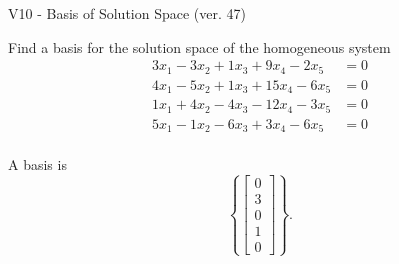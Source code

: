 \begin{exercise}
  \begin{exerciseTitle}V10 - Basis of Solution Space (ver. 47)\end{exerciseTitle}
  \begin{exerciseStatement}
    Find a basis for the solution space of the homogeneous system 
\begin{align*}
 3 x_ 1 -3 x_ 2 + 1 x_ 3 + 9 x_ 4 -2 x_ 5 &= 0  \\ 
  4 x_ 1 -5 x_ 2 + 1 x_ 3 + 15 x_ 4 -6 x_ 5 &= 0  \\ 
  1 x_ 1 + 4 x_ 2 -4 x_ 3 -12 x_ 4 -3 x_ 5 &= 0  \\ 
  5 x_ 1 -1 x_ 2 -6 x_ 3 + 3 x_ 4 -6 x_ 5 &= 0  \\ 
 \end{align*}


 
  \end{exerciseStatement}

  \begin{exerciseAnswer}
   A basis is   
\[\left\{\left[\begin{array}{c}
0 \\
3 \\
0 \\
1 \\
0
\end{array}\right]\right\}.\]

  


  \end{exerciseAnswer}
\end{exercise}